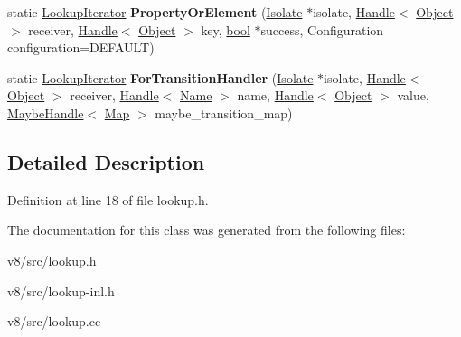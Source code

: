 \begin{DoxyCompactItemize}
\item 
\mbox{\label{classv8_1_1internal_1_1LookupIterator_af935b2c63192f1946d7a212b32760ee2}} 
static \mbox{\hyperlink{classv8_1_1internal_1_1LookupIterator}{Lookup\+Iterator}} {\bfseries Property\+Or\+Element} (\mbox{\hyperlink{classv8_1_1internal_1_1Isolate}{Isolate}} $\ast$isolate, \mbox{\hyperlink{classv8_1_1internal_1_1Handle}{Handle}}$<$ \mbox{\hyperlink{classv8_1_1internal_1_1Object}{Object}} $>$ receiver, \mbox{\hyperlink{classv8_1_1internal_1_1Handle}{Handle}}$<$ \mbox{\hyperlink{classv8_1_1internal_1_1Object}{Object}} $>$ key, \mbox{\hyperlink{classbool}{bool}} $\ast$success, Configuration configuration=D\+E\+F\+A\+U\+LT)
\item 
\mbox{\label{classv8_1_1internal_1_1LookupIterator_a49f2afc9d0b7da8648165c217fc9ae47}} 
static \mbox{\hyperlink{classv8_1_1internal_1_1LookupIterator}{Lookup\+Iterator}} {\bfseries For\+Transition\+Handler} (\mbox{\hyperlink{classv8_1_1internal_1_1Isolate}{Isolate}} $\ast$isolate, \mbox{\hyperlink{classv8_1_1internal_1_1Handle}{Handle}}$<$ \mbox{\hyperlink{classv8_1_1internal_1_1Object}{Object}} $>$ receiver, \mbox{\hyperlink{classv8_1_1internal_1_1Handle}{Handle}}$<$ \mbox{\hyperlink{classv8_1_1internal_1_1Name}{Name}} $>$ name, \mbox{\hyperlink{classv8_1_1internal_1_1Handle}{Handle}}$<$ \mbox{\hyperlink{classv8_1_1internal_1_1Object}{Object}} $>$ value, \mbox{\hyperlink{classv8_1_1internal_1_1MaybeHandle}{Maybe\+Handle}}$<$ \mbox{\hyperlink{classv8_1_1internal_1_1Map}{Map}} $>$ maybe\+\_\+transition\+\_\+map)
\end{DoxyCompactItemize}


\subsection{Detailed Description}


Definition at line 18 of file lookup.\+h.



The documentation for this class was generated from the following files\+:\begin{DoxyCompactItemize}
\item 
v8/src/lookup.\+h\item 
v8/src/lookup-\/inl.\+h\item 
v8/src/lookup.\+cc\end{DoxyCompactItemize}
